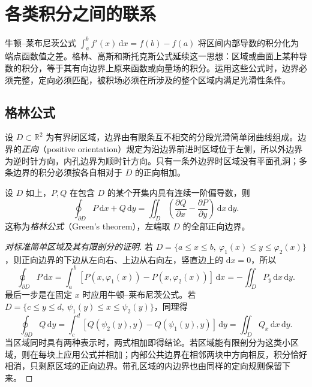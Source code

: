 \section{各类积分之间的联系}
\label{sec:relations-among-types-of-integrals}

牛顿--莱布尼茨公式 $\int_a^bf'(x)\,\mathrm dx=f(b)-f(a)$ 将区间内部导数的积分化为端点函数值之差。格林、高斯和斯托克斯公式延续这一思想：区域或曲面上某种导数的积分，等于其有向边界上原来函数或向量场的积分。运用这些公式时，边界必须完整，定向必须匹配，被积场必须在所涉及的整个区域内满足光滑性条件。

\subsection{格林公式}
\label{subsec:green-formula}

设 $D\subset\mathbb R^2$ 为有界闭区域，边界由有限条互不相交的分段光滑简单闭曲线组成。边界的\emph{正向}（positive orientation）规定为沿边界前进时区域位于左侧，所以外边界为逆时针方向，内孔边界为顺时针方向。只有一条外边界时区域没有平面孔洞；多条边界的积分必须按各自相对于 $D$ 的正向相加。

\begin{theorem}[格林公式]
\label{thm:green-formula}
设 $D$ 如上，$P,Q$ 在包含 $D$ 的某个开集内具有连续一阶偏导数，则
\begin{equation}
\label{eq:green-formula}
    \oint_{\partial D}P\,\mathrm dx+Q\,\mathrm dy
    =\iint_D\left(\frac{\partial Q}{\partial x}-\frac{\partial P}{\partial y}\right)
      \,\mathrm dx\,\mathrm dy.
\end{equation}
这称为\emph{格林公式}（Green's theorem），左端取 $D$ 的全部正向边界。
\end{theorem}

\begin{proof}[对标准简单区域及其有限剖分的证明]
若 $D=\{a\leq x\leq b,\ \varphi_1(x)\leq y\leq\varphi_2(x)\}$，则正向边界的下边从左向右、上边从右向左，竖直边上的 $\mathrm dx=0$，所以
\[
    \oint_{\partial D}P\,\mathrm dx
    =\int_a^b[P(x,\varphi_1(x))-P(x,\varphi_2(x))]\,\mathrm dx
    =-\iint_D P_y\,\mathrm dx\,\mathrm dy.
\]
最后一步是在固定 $x$ 时应用牛顿--莱布尼茨公式。若 $D=\{c\leq y\leq d,\ \psi_1(y)\leq x\leq\psi_2(y)\}$，同理得
\[
    \oint_{\partial D}Q\,\mathrm dy
    =\int_c^d[Q(\psi_2(y),y)-Q(\psi_1(y),y)]\,\mathrm dy
    =\iint_D Q_x\,\mathrm dx\,\mathrm dy.
\]
当区域同时具有两种表示时，两式相加即得结论。若区域能有限剖分为这类小区域，则在每块上应用公式并相加；内部公共边界在相邻两块中方向相反，积分恰好相消，只剩原区域的正向边界。带孔区域的内边界也由同样的定向规则保留下来。
\end{proof}

